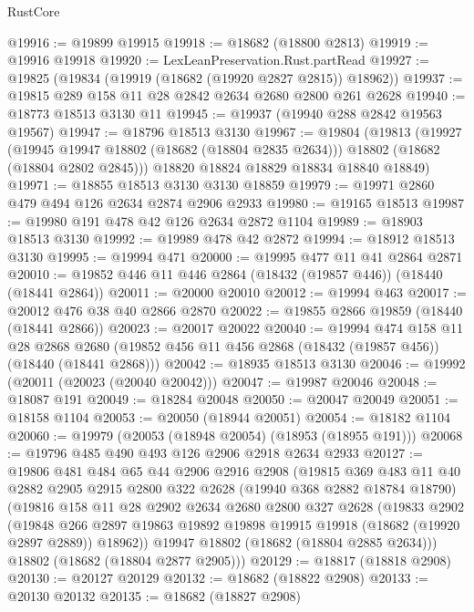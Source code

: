 \begin{lexlean}{RustCore}
\begin{coremodule}
@19916 := @19899 @19915
@19918 := @18682 (@18800 @2813)
@19919 := @19916 @19918
@19920 := LexLeanPreservation.Rust.partRead
@19927 := @19825 (@19834 (@19919 (@18682 (@19920 @2827 @2815)) @18962))
@19937 := @19815 @289 @158 @11 @28 @2842 @2634 @2680 @2800 @261 @2628
@19940 := @18773 @18513 @3130 @11
@19945 := @19937 (@19940 @288 @2842 @19563 @19567)
@19947 := @18796 @18513 @3130
@19967 := @19804
    (@19813
      (@19927
        (@19945 @19947 @18802 (@18682 (@18804 @2835 @2634)))
        @18802
        (@18682 (@18804 @2802 @2845)))
      @18820
      @18824
      @18829
      @18834
      @18840
      @18849)
@19971 := @18855 @18513 @3130 @3130 @18859
@19979 := @19971 @2860 @479 @494 @126 @2634 @2874 @2906 @2933
@19980 := @19165 @18513
@19987 := @19980 @191 @478 @42 @126 @2634 @2872 @1104
@19989 := @18903 @18513 @3130
@19992 := @19989 @478 @42 @2872
@19994 := @18912 @18513 @3130
@19995 := @19994 @471
@20000 := @19995 @477 @11 @41 @2864 @2871
@20010 := @19852 @446 @11 @446 @2864 (@18432 (@19857 @446)) (@18440 (@18441 @2864))
@20011 := @20000 @20010
@20012 := @19994 @463
@20017 := @20012 @476 @38 @40 @2866 @2870
@20022 := @19855 @2866 @19859 (@18440 (@18441 @2866))
@20023 := @20017 @20022
@20040 := @19994
    @474
    @158
    @11
    @28
    @2868
    @2680
    (@19852 @456 @11 @456 @2868 (@18432 (@19857 @456)) (@18440 (@18441 @2868)))
@20042 := @18935 @18513 @3130
@20046 := @19992 (@20011 (@20023 (@20040 @20042)))
@20047 := @19987 @20046
@20048 := @18087 @191
@20049 := @18284 @20048
@20050 := @20047 @20049
@20051 := @18158 @1104
@20053 := @20050 (@18944 @20051)
@20054 := @18182 @1104
@20060 := @19979 (@20053 (@18948 @20054) (@18953 (@18955 @191)))
@20068 := @19796 @485 @490 @493 @126 @2906 @2918 @2634 @2933
@20127 := @19806
    @481
    @484
    @65
    @44
    @2906
    @2916
    @2908
    (@19815
      @369
      @483
      @11
      @40
      @2882
      @2905
      @2915
      @2800
      @322
      @2628
      (@19940 @368 @2882 @18784 @18790)
      (@19816
        @158
        @11
        @28
        @2902
        @2634
        @2680
        @2800
        @327
        @2628
        (@19833
          @2902
          (@19848
            @266
            @2897
            @19863
            @19892
            @19898
            @19915
            @19918
            (@18682 (@19920 @2897 @2889))
            @18962))
        @19947
        @18802
        (@18682 (@18804 @2885 @2634)))
      @18802
      (@18682 (@18804 @2877 @2905)))
@20129 := @18817 (@18818 @2908)
@20130 := @20127 @20129
@20132 := @18682 (@18822 @2908)
@20133 := @20130 @20132
@20135 := @18682 (@18827 @2908)

\end{coremodule}
\end{lexlean}
